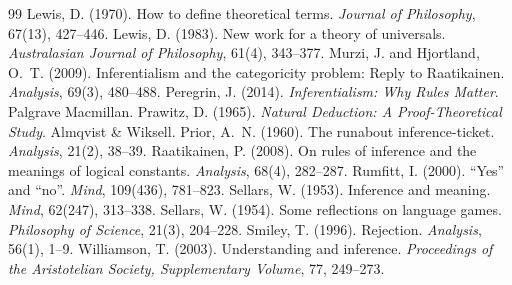 \documentclass{situationist-preprint}
\begin{document}
\begin{thebibliography}{99}
 Lewis, D. (1970). How to define theoretical terms. \emph{Journal of Philosophy}, 67(13), 427--446.
 Lewis, D. (1983). New work for a theory of universals. \emph{Australasian Journal of Philosophy}, 61(4), 343--377.
 Murzi, J. and Hjortland, O.~T. (2009). Inferentialism and the categoricity problem: Reply to Raatikainen. \emph{Analysis}, 69(3), 480--488.
 Peregrin, J. (2014). \emph{Inferentialism: Why Rules Matter}. Palgrave Macmillan.
 Prawitz, D. (1965). \emph{Natural Deduction: A Proof-Theoretical Study}. Almqvist \& Wiksell.
 Prior, A.~N. (1960). The runabout inference-ticket. \emph{Analysis}, 21(2), 38--39.
 Raatikainen, P. (2008). On rules of inference and the meanings of logical constants. \emph{Analysis}, 68(4), 282--287.
 Rumfitt, I. (2000). \enquote{Yes} and \enquote{no}. \emph{Mind}, 109(436), 781--823.
 Sellars, W. (1953). Inference and meaning. \emph{Mind}, 62(247), 313--338.
 Sellars, W. (1954). Some reflections on language games. \emph{Philosophy of Science}, 21(3), 204--228.
 Smiley, T. (1996). Rejection. \emph{Analysis}, 56(1), 1--9.
 Williamson, T. (2003). Understanding and inference. \emph{Proceedings of the Aristotelian Society, Supplementary Volume}, 77, 249--273.
\end{thebibliography}
\end{document}
